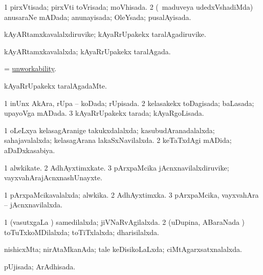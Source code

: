 \bentry
{} 
\gl{\gu}
\expl{}
\bmng
\bnum
\num{1} pirxVtisada; pirxVti toVrisada; moVhisada. 
\num{2} (\kanmu\ maduveya udedxVshadiMda) anusaraNe mADada; anunayisada; OleYsada; pusalAyisada. 
\enum
\emng
\eentry

\bentry
{} 
\gl{\nA}
\expl{}
\bmng
kAyARtamxkavalalxdiruvike; kAyaRrUpakekx taralAgadiruvike. 
\emng
\eentry

\bentry
{} 
\gl{\gu}
\expl{}
\bmng
kAyARtamxkavalalxda; kAyaRrUpakekx taralAgada. 
\emng
\eentry

\bentry
{} 
\gl{\nA}
\expl{}
\bmng
= \hyperlink{unworkability}{unworkability}. 
\emng
\eentry

\bentry
{} 
\gl{\kirxvi}
\expl{}
\bmng
kAyaRrUpakekx taralAgadaMte. 
\emng
\eentry

\bentry
{} 
\gl{\gu}
\expl{}
\bmng
\bnum
\num{1} inUnx AkAra, rUpa -- koDada; rUpisada. 
\num{2} kelasakekx toDagisada; baLasada; upayoVga mADada. 
\num{3} kAyaRrUpakekx tarada; kAyaRgoLisada. 
\enum
\emng
\eentry

\bentry
{} 
\gl{\gu}
\expl{}
\bmng
\bnum
\num{1} oLeLxya kelasagAranige takukxdalalxda; kasubudAranadalalxda; sahajavalalxda; kelasagArana lakaSxNavilalxda. 
\num{2} keTaTxdAgi mADida; aDaDxkasabiya. 
\enum
\emng
\eentry

\bentry
{} 
\gl{\nA}
\expl{}
\bmng
\bnum
\num{1} alwkikate. 
\num{2} AdhAyxtimxkate. 
\num{3} pArxpaMcika jAcnxnavilalxdiruvike; vayxvahArajAcnxnashUnayxte. 
\enum
\emng
\eentry

\bentry
{} 
\gl{\gu}
\expl{}
\bmng
\bnum
\num{1} pArxpaMcikavalalxda; alwkika. 
\num{2} AdhAyxtimxka. 
\num{3} pArxpaMcika, vayxvahAra -- jAcnxnavilalxda. 
\enum
\emng
\eentry

\bentry
{} 
\gl{\gu}
\expl{}
\bmng
\bnum
\num{1} (vasutxgaLa \vi) samedilalxda; jiVNaRvAgilalxda. 
\num{2} (uDupina, ABaraNada \vi) toTuTxkoMDilalxda; toTiTxlalxda; dharisilalxda. 
\enum
\emng
\eentry

\bentry
{} 
\gl{\gu}
\expl{}
\bmng
nishicxMta; nirAtaMkanAda; tale keDisikoLaLxda; ciMtAgarxsatxnalalxda. 
\emng
\eentry

\bentry
{} 
\gl{\gu}
\expl{}
\bmng
pUjisada; ArAdhisada. 
\emng
\eentry

